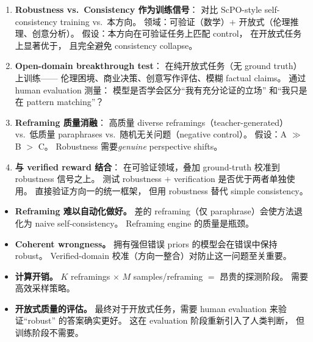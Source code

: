 \documentclass[12pt,a4paper]{article}
\begin{document}
\begin{expbox}
\begin{enumerate}[leftmargin=1.5em]
  \item \textbf{Robustness vs.\ Consistency 作为训练信号}：
    对比 ScPO-style self-consistency training vs.\ 本方向。
    领域：可验证（数学）$+$ 开放式（伦理推理、创意分析）。
    假设：本方向在可验证任务上匹配 control，
    在开放式任务上显著优于，
    且完全避免 consistency collapse。

  \item \textbf{Open-domain breakthrough test}：
    在纯开放式任务（无 ground truth）上训练——
    伦理困境、商业决策、创意写作评估、模糊 factual claims。
    通过 human evaluation 测量：
    模型是否学会区分``我有充分论证的立场''
    和``我只是在 pattern matching''？

  \item \textbf{Reframing 质量消融}：
    高质量 diverse reframings（teacher-generated）
    vs.\ 低质量 paraphrases
    vs.\ 随机无关问题（negative control）。
    假设：A $\gg$ B $>$ C。
    Robustness 需要\textit{genuine} perspective shifts。

  \item \textbf{与 verified reward 结合}：
    在可验证领域，叠加 ground-truth 校准到 robustness 信号之上。
    测试 robustness $+$ verification 是否优于两者单独使用。
    直接验证方向一的统一框架，
    但用 robustness 替代 simple consistency。
\end{enumerate}
\end{expbox}

\begin{riskbox}
\begin{itemize}[leftmargin=1.5em]
  \item \textbf{Reframing 难以自动化做好。}
    差的 reframing（仅 paraphrase）会使方法退化为 naive self-consistency。
    Reframing engine 的质量是瓶颈。
  \item \textbf{Coherent wrongness。}
    拥有强但错误 priors 的模型会在错误中保持 robust。
    Verified-domain 校准（方向一整合）对防止这一问题至关重要。
  \item \textbf{计算开销。}
    $K$ reframings $\times$ $M$ samples/reframing $=$ 昂贵的探测阶段。
    需要高效采样策略。
  \item \textbf{开放式质量的评估。}
    最终对于开放式任务，需要 human evaluation 来验证``robust''
    的答案确实更好。
    这在 evaluation 阶段重新引入了人类判断，
    但训练阶段不需要。
\end{itemize}
\end{riskbox}
\end{document}
